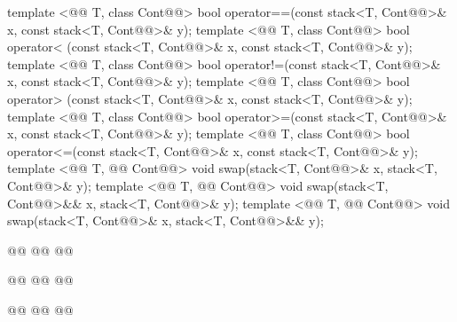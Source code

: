 \documentclass[american,twoside]{book}
\begin{document}
\begin{codeblock}
{  template <@@ T, class Cont@@>
    bool operator==(const stack<T, Cont@@>& x, const stack<T, Cont@@>& y);
  template <@@ T, class Cont@@>
    bool operator< (const stack<T, Cont@@>& x, const stack<T, Cont@@>& y);
  template <@@ T, class Cont@@>
    bool operator!=(const stack<T, Cont@@>& x, const stack<T, Cont@@>& y);
  template <@@ T, class Cont@@>
    bool operator> (const stack<T, Cont@@>& x, const stack<T, Cont@@>& y);
  template <@@ T, class Cont@@>
    bool operator>=(const stack<T, Cont@@>& x, const stack<T, Cont@@>& y);
  template <@@ T, class Cont@@>
    bool operator<=(const stack<T, Cont@@>& x, const stack<T, Cont@@>& y);
  template <@@ T, @@ Cont@@>
    void swap(stack<T, Cont@@>& x, stack<T, Cont@@>& y);
  template <@@ T, @@ Cont@@>
    void swap(stack<T, Cont@@>&& x, stack<T, Cont@@>& y);
  template <@@ T, @@ Cont@@>
    void swap(stack<T, Cont@@>& x, stack<T, Cont@@>&& y);

  @@
    @@
    @@

  @@
    @@
      @@

  @@
    @@
      @@
}
\end{codeblock}
\end{document}
